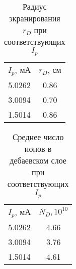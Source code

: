 \documentclass[a4paper]{article}
\begin{document}
            \begin{table}[h]
    \centering
        \begin{tabular}{|c|c|}
        \cline{1-2}
        $I_{p}$,  мА & $r_{D}$, см\\ \cline{1-2}
        5.0262 &  0.86 \\ \cline{1-2}
        3.0094 &  0.70\\ \cline{1-2}
        1.5014 &  0.86\\ \cline{1-2}
        
        \end{tabular}
        \caption{Радиус экранирования  $r_{D}$ при соответствующих $I_p$}
        \label{tab:my_label}
    \end{table}


    \begin{table}[h]
    \centering
        \begin{tabular}{|c|c|}
        \cline{1-2}
        $I_{p}$,  мА & $N_D, 10^{10}$\\ \cline{1-2}
        5.0262 &  4.66\\ \cline{1-2}
        3.0094 &  3.76\\ \cline{1-2}
        1.5014 & 4.61\\ \cline{1-2}
        
        \end{tabular}
        \caption{Среднее число ионов в дебаевском слое при соответствующих $I_p$}
        \label{tab:my_label}
    \end{table}

    
\end{document}
